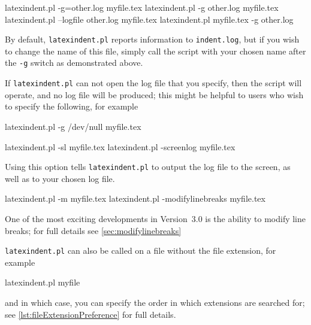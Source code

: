  \begin{commandshell}
latexindent.pl -g=other.log myfile.tex
latexindent.pl -g other.log myfile.tex
latexindent.pl --logfile other.log myfile.tex
latexindent.pl myfile.tex -g other.log 
\end{commandshell}

 By default, \texttt{latexindent.pl} reports information to \texttt{indent.log}, but if
 you wish to change the name of this file, simply call the script with your chosen name
 after the \texttt{-g} switch as demonstrated above.

  If \texttt{latexindent.pl} can not open
 the log file that you specify, then the script will operate, and no log file will be
 produced; this might be helpful to users who wish to specify the following, for example

 \begin{commandshell}
latexindent.pl -g /dev/null myfile.tex
\end{commandshell}


 \begin{commandshell}
latexindent.pl -sl myfile.tex
latexindent.pl -screenlog myfile.tex
\end{commandshell}

 Using this  option tells
 \texttt{latexindent.pl} to output the log file to the screen, as well as to your chosen
 log file.%


 \begin{commandshell}
latexindent.pl -m myfile.tex
latexindent.pl -modifylinebreaks myfile.tex
\end{commandshell}

 One of the most exciting developments in Version~3.0 is the ability to modify line
 breaks; for full details see \vref{sec:modifylinebreaks}

 \texttt{latexindent.pl} can also be called on a file without the file extension, for
 example

 \begin{commandshell}
latexindent.pl myfile
\end{commandshell}

 and in which case, you can specify the order in which extensions are searched for; see
 \vref{lst:fileExtensionPreference} for full details. 

